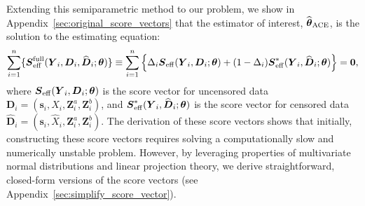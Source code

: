 \documentclass[12pt]{article}
\def\H{{\cal H}}
\def\wh{\widehat}
\def\be{\begin{eqnarray}}
\def\ee{\end{eqnarray}}
\def\wh{\widehat}
\def\bS{{\mathbf S}}
\def\bzero{{\mathbf 0}}
\def\btheta{{\boldsymbol{\theta}}}
\def\bzero{{\boldsymbol{0}}}
\def\bb{{\boldsymbol b}}
\def\bs{{\boldsymbol s}}
\def\bD{{\boldsymbol D}}
\def\bS{{\boldsymbol S}}
\def\bY{{\boldsymbol Y}}
\def\bZ{{\boldsymbol Z}}
\def\tilD{\bD}
\def\ACEest{\wh{\btheta}_{\rm ACE}}
\begin{document}
Extending this semiparametric method to our problem, we show in Appendix~\ref{sec:original_score_vectors} that the estimator of interest, $\ACEest$, is the solution to  the estimating equation:
\be
\label{eqn:total_estimating_equation}
\sum_{i=1}^n \{\bS_{\rm{eff}}^{\rm{full}}(\bY_i,\tilD_i,\widehat{\tilD}_i;\btheta)\}\equiv
\sum_{i=1}^n \left\{\Delta_i\bS_{\rm{eff}}(\bY_i,\tilD_i;\btheta) + (1 - \Delta_i)\bS_{\rm{eff}}^*(\bY_i,\widehat{\tilD}_i;\btheta)\right\}=\bzero,
\ee
where $\bS_{\rm{eff}}(\bY_i,\tilD_i;\btheta)$ is the score vector for uncensored data 
$\tilD_i=(\bs_i, X_i, \bZ^a_i, \bZ^b_i)$,  and 
$\bS_{\rm{eff}}^*(\bY_i,\widehat{\tilD}_i;\btheta)$ is the score vector for censored data $\widehat{\tilD}_i=(\bs_i, \widehat{X}_i, \bZ^a_i, \bZ^b_i)$. The derivation of these score vectors shows that initially, constructing these score vectors requires solving a computationally slow and numerically unstable problem. However, by leveraging properties of multivariate normal distributions and linear projection theory, we derive straightforward, closed-form versions of the score vectors (see Appendix~\ref{sec:simplify_score_vector}).


\end{document}
